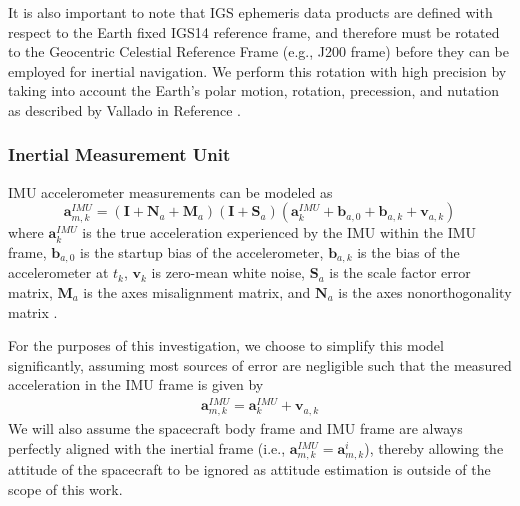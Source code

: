 \documentclass[letterpaper, paper,11pt]{AAS}		%
\begin{document}
It is also important to note that IGS ephemeris data products are defined with respect to the Earth fixed IGS14 reference frame, and therefore must be rotated to the Geocentric Celestial Reference Frame (e.g., J200 frame) before they can be employed for inertial navigation. We perform this rotation with high precision by taking into account the Earth's polar motion, rotation, precession, and nutation as described by Vallado in Reference .

\subsubsection{Inertial Measurement Unit}
IMU accelerometer measurements can be modeled as 
\begin{equation}
	\mathbf{a}_{m,k}^{IMU} = (\mathbf{I} + \mathbf{N}_a + \mathbf{M}_a)(\mathbf{I} + \mathbf{S}_a)(\mathbf{a}_k^{IMU} + \mathbf{b}_{a,0} + \mathbf{b}_{a,k} + \mathbf{v}_{a,k})
\end{equation}
where $\mathbf{a}_k^{IMU}$ is the true acceleration experienced by the IMU within the IMU frame, $\mathbf{b}_{a,0}$ is the startup bias of the accelerometer, $\mathbf{b}_{a,k}$ is the bias of the accelerometer at $t_k$, $\mathbf{v}_k$ is zero-mean white noise, $\mathbf{S}_a$ is the scale factor error matrix, $\mathbf{M}_a$ is the axes misalignment matrix, and $\mathbf{N}_a$ is the axes nonorthogonality matrix \cite{DeMars_2014}.

For the purposes of this investigation, we choose to simplify this model significantly, assuming most sources of error are negligible such that the measured acceleration in the IMU frame is given by 
\begin{align}
	\mathbf{a}_{m,k}^{IMU} = \mathbf{a}_k^{IMU} + \mathbf{v}_{a,k}
\end{align}
We will also assume the spacecraft body frame and IMU frame are always perfectly aligned with the inertial frame (i.e., $\mathbf{a}_{m,k}^{IMU}=\mathbf{a}_{m,k}^i$), thereby allowing the attitude of the spacecraft to be ignored as attitude estimation is outside of the scope of this work. 
\end{document}
